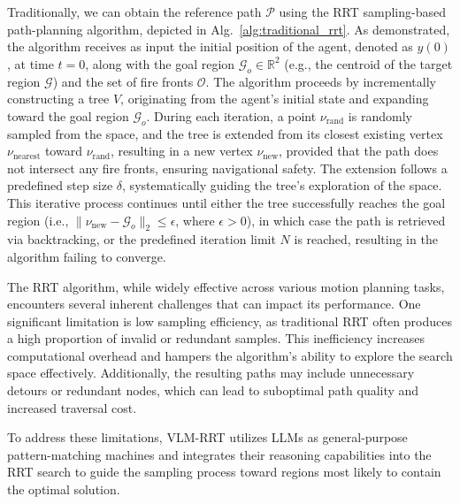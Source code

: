 Traditionally, we can obtain the reference path \( \mathcal{P} \) using the RRT sampling-based path-planning algorithm, depicted in Alg.~\ref{alg:traditional_rrt}. As demonstrated, the algorithm receives as input the initial position of the agent, denoted as \( y(0) \), at time \( t = 0 \), along with the goal region \( \mathcal{G}_o \in \mathbb{R}^2 \) (e.g., the centroid of the target region \( \mathcal{G} \)) and the set of fire fronts \( \mathcal{O} \). The algorithm proceeds by incrementally constructing a tree \( V \), originating from the agent's initial state and expanding toward the goal region \( \mathcal{G}_o \). During each iteration, a point \( \nu_{\text{rand}} \) is randomly sampled from the space, and the tree is extended from its closest existing vertex \( \nu_{\text{nearest}} \) toward \( \nu_{\text{rand}} \), resulting in a new vertex \( \nu_{\text{new}} \), provided that the path does not intersect any fire fronts, ensuring navigational safety. The extension follows a predefined step size \( \delta \), systematically guiding the tree's exploration of the space. This iterative process continues until either the tree successfully reaches the goal region (i.e., \( \|\nu_{\text{new}} - \mathcal{G}_o\|_2 \leq \epsilon \), where \( \epsilon > 0 \)), in which case the path is retrieved via backtracking, or the predefined iteration limit \( N \) is reached, resulting in the algorithm failing to converge.

The RRT algorithm, while widely effective across various motion planning tasks, encounters several inherent challenges that can impact its performance. One significant limitation is low sampling efficiency, as traditional RRT often produces a high proportion of invalid or redundant samples. This inefficiency increases computational overhead and hampers the algorithm's ability to explore the search space effectively. Additionally, the resulting paths may include unnecessary detours or redundant nodes, which can lead to suboptimal path quality and increased traversal cost.

To address these limitations, VLM-RRT utilizes LLMs as general-purpose pattern-matching machines and integrates their reasoning capabilities into the RRT search to guide the sampling process toward regions most likely to contain the optimal solution.






